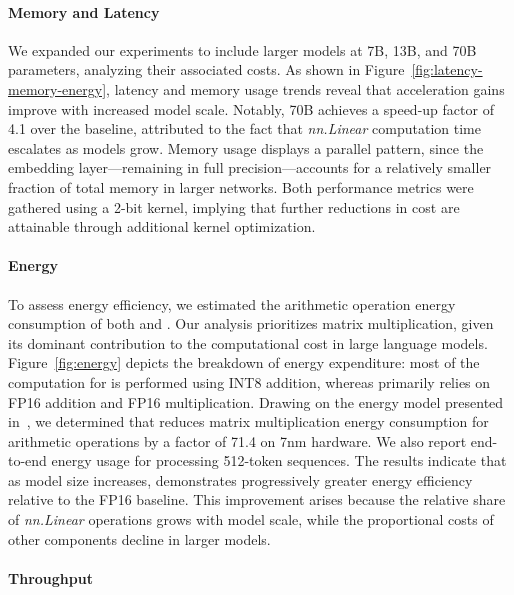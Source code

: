 \paragraph{Memory and Latency}

We expanded our experiments to include larger models at 7B, 13B, and 70B parameters, analyzing their associated costs. As shown in Figure~\ref{fig:latency-memory-energy}, latency and memory usage trends reveal that acceleration gains improve with increased model scale. Notably,  70B achieves a speed-up factor of 4.1 over the  baseline, attributed to the fact that \emph{nn.Linear} computation time escalates as models grow. Memory usage displays a parallel pattern, since the embedding layer—remaining in full precision—accounts for a relatively smaller fraction of total memory in larger networks. Both performance metrics were gathered using a 2-bit kernel, implying that further reductions in cost are attainable through additional kernel optimization.

\paragraph{Energy}

To assess energy efficiency, we estimated the arithmetic operation energy consumption of both  and . Our analysis prioritizes matrix multiplication, given its dominant contribution to the computational cost in large language models. Figure~\ref{fig:energy} depicts the breakdown of energy expenditure: most of the computation for  is performed using INT8 addition, whereas  primarily relies on FP16 addition and FP16 multiplication. Drawing on the energy model presented in~\cite{energycost, pokebnn}, we determined that  reduces matrix multiplication energy consumption for arithmetic operations by a factor of 71.4 on 7nm hardware. We also report end-to-end energy usage for processing 512-token sequences. The results indicate that as model size increases,  demonstrates progressively greater energy efficiency relative to the FP16  baseline. This improvement arises because the relative share of \emph{nn.Linear} operations grows with model scale, while the proportional costs of other components decline in larger models.

\paragraph{Throughput}

